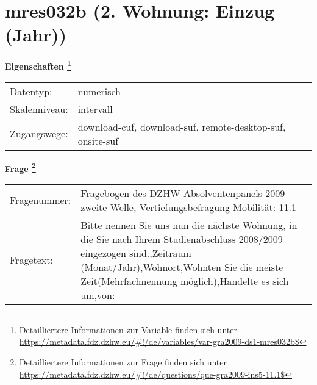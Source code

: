 
    \setcounter{footnote}{0}

    \vspace*{-1.8cm}
	\section{mres032b (2. Wohnung: Einzug (Jahr))}
	\label{section:mres032b}



    \vspace*{0.5cm}
    \noindent\textbf{Eigenschaften
	\footnote{Detailliertere Informationen zur Variable finden sich unter
		\url{https://metadata.fdz.dzhw.eu/\#!/de/variables/var-gra2009-ds1-mres032b$}}}\\
	\begin{tabularx}{\hsize}{@{}lX}
	Datentyp: & numerisch \\
	Skalenniveau: & intervall \\
	Zugangswege: &
	  download-cuf, 
	  download-suf, 
	  remote-desktop-suf, 
	  onsite-suf
 \\
    \end{tabularx}



				\vspace*{0.5cm}
                \noindent\textbf{Frage
	                \footnote{Detailliertere Informationen zur Frage finden sich unter
		              \url{https://metadata.fdz.dzhw.eu/\#!/de/questions/que-gra2009-ins5-11.1$}}}\\
				\begin{tabularx}{\hsize}{@{}lX}
					Fragenummer: &
					  Fragebogen des DZHW-Absolventenpanels 2009 - zweite Welle, Vertiefungsbefragung Mobilität:
					  11.1
 \\
					Fragetext: & Bitte nennen Sie uns nun die nächste Wohnung, in die Sie nach Ihrem Studienabschluss 2008/2009 eingezogen sind.,Zeitraum (Monat/Jahr),Wohnort,Wohnten Sie die meiste Zeit(Mehrfachnennung möglich),Handelte es sich um,von: \\
				\end{tabularx}





